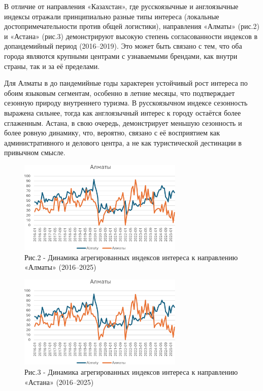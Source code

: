 \begin{multicols}{2}
В отличие от направления «Казахстан», где русскоязычные и англоязычные
индексы отражали принципиально разные типы интереса (локальные
достопримечательности против общей логистики), направления «Алматы»
(рис.2) и «Астана» (рис.3) демонстрируют высокую степень
согласованности индексов в допандемийный период (2016--2019). Это может
быть связано с тем, что оба города являются крупными центрами с
узнаваемыми брендами, как внутри страны, так и за её пределами.

Для Алматы в до пандемийные годы характерен устойчивый рост интереса по
обоим языковым сегментам, особенно в летние месяцы, что подтверждает
сезонную природу внутреннего туризма. В русскоязычном индексе сезонность
выражена сильнее, тогда как англоязычный интерес к городу остаётся более
сглаженным. Астана, в свою очередь, демонстрирует меньшую сезонность и
более ровную динамику, что, вероятно, связано с её восприятием как
административного и делового центра, а не как туристической дестинации в
привычном смысле.
\end{multicols}

\begin{figure}[H]
	\centering
	\includegraphics[width=0.7\textwidth]{media/ekon4/image8}
	\caption*{Рис.2 - Динамика агрегированных индексов интереса к направлению «Алматы» (2016--2025)}
\end{figure}
\begin{figure}[H]
	\centering
	\includegraphics[width=0.7\textwidth]{media/ekon4/image8}
	\caption*{Рис.3 - Динамика агрегированных индексов интереса к направлению «Астана» (2016--2025)}
\end{figure}

